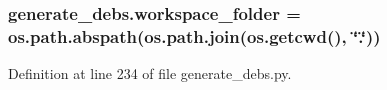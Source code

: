 \subsubsection[{\texorpdfstring{workspace\+\_\+folder}{workspace_folder}}]{\setlength{\rightskip}{0pt plus 5cm}generate\+\_\+debs.\+workspace\+\_\+folder = os.\+path.\+abspath(os.\+path.\+join(os.\+getcwd(), \char`\"{}.\char`\"{}))}\hypertarget{namespacegenerate__debs_acb69863b90257249a30e43ebacfb8bd8}{}\label{namespacegenerate__debs_acb69863b90257249a30e43ebacfb8bd8}


Definition at line 234 of file generate\+\_\+debs.\+py.

